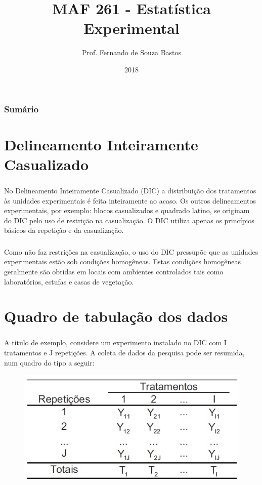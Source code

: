 \documentclass[14pt,aspectratio=1610]{beamer}
\title{MAF 261 - Estatística Experimental}
\author{Prof. Fernando de Souza Bastos}
\institute{Instituto de Ciências Exatas e Tecnológicas\texorpdfstring{\\ Universidade Federal de Viçosa}{}\texorpdfstring{\\ Campus UFV - Florestal}{}}
\date{2018}
\begin{document}


\frame{\titlepage}

\begin{frame}{}
\frametitle{\bf Sumário}
\tableofcontents
\end{frame}

\section{Delineamento Inteiramente Casualizado}
\begin{frame}{}
\frametitle{}
\begin{block}{}
\justifying
No Delineamento Inteiramente Casualizado (DIC) a distribuição dos tratamentos às
unidades experimentais é feita inteiramente ao acaso. Os outros delineamentos
experimentais, por exemplo: blocos casualizados e quadrado latino, se originam do DIC
pelo uso de restrição na casualização. O DIC utiliza apenas os princípios básicos da
repetição e da casualização.
\end{block}
\end{frame}

\begin{frame}{}
\frametitle{}
\begin{block}{}
\justifying
Como não faz restrições na casualização, o uso do DIC pressupõe que as
unidades experimentais estão sob condições homogêneas. Estas condições homogêneas
geralmente são obtidas em locais com ambientes controlados tais como laboratórios,
estufas e casas de vegetação.
\end{block}
\end{frame}

\section{Quadro de tabulação dos dados}
\begin{frame}{}
\frametitle{}
\begin{block}{}
\justifying
A título de exemplo, considere um experimento instalado no DIC com I tratamentos
e J repetições. A coleta de dados da pesquisa pode ser resumida, num quadro do tipo a
seguir:
\begin{figure}[H]
    \centering
    \includegraphics[scale=0.5]{Figuras/fig1}
  \end{figure}
\end{block}
\end{frame}
\end{document}
